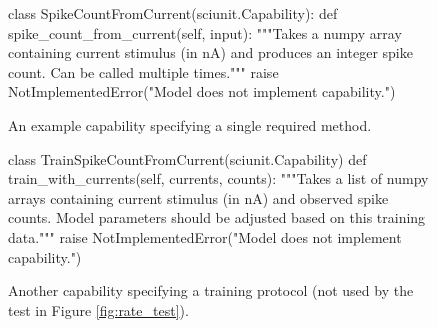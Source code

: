 \documentclass[11pt,letterpaper]{article}
\begin{document}
%
\begin{figure}
\begin{python}
class SpikeCountFromCurrent(sciunit.Capability):
  def spike_count_from_current(self, input): 
    """Takes a numpy array containing current stimulus (in nA) and
    produces an integer spike count. Can be called multiple times."""
    raise NotImplementedError("Model does not implement capability.")
\end{python}
\caption{An example capability specifying a single required method.}
\label{fig:capability}
\end{figure}

\begin{figure}
\begin{python}
class TrainSpikeCountFromCurrent(sciunit.Capability)
  def train_with_currents(self, currents, counts):
    """Takes a list of numpy arrays containing current stimulus (in nA) and
    observed spike counts. Model parameters should be adjusted based on this
    training data."""
    raise NotImplementedError("Model does not implement capability.")
\end{python}
\caption{Another capability specifying a training protocol (not used by the test in Figure \ref{fig:rate_test}).}
\label{fig:training}
\end{figure}
\end{document}
